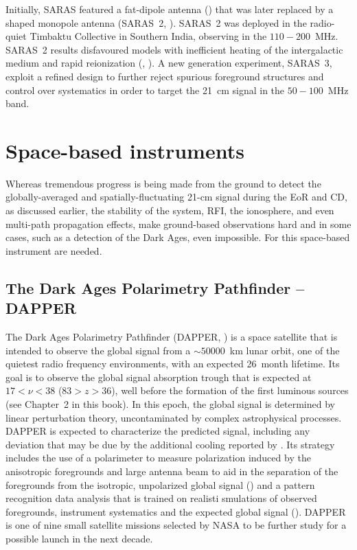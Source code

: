 Initially, SARAS featured a fat-dipole antenna (\cite{patra13}) that was later replaced by a shaped monopole antenna (SARAS~2, \cite{singh18a}). SARAS~2 was deployed in the radio-quiet Timbaktu Collective in Southern India, observing in the $110-200$~MHz. SARAS~2 results disfavoured models with inefficient heating of the intergalactic medium and rapid reionization (\cite{singh17}, \cite{singh18b}). 
A new generation experiment, SARAS~3, exploit a refined design to further reject spurious foreground structures and control over systematics in order to target the 21~cm signal in the $50-100$~MHz band.




\section{Space-based instruments}

Whereas tremendous progress is being made from the ground to detect the globally-averaged and spatially-fluctuating 21-cm signal during the EoR and CD, as discussed earlier, the stability of the system, RFI, the ionosphere, and even multi-path propagation effects, make ground-based observations hard and in some cases, such as a detection of the Dark Ages, even impossible. For this space-based instrument are needed. 






\subsection{The Dark Ages Polarimetry Pathfinder -- DAPPER}

The Dark Ages Polarimetry Pathfinder (DAPPER, \cite{burns19}) is a space satellite that is intended to observe the global signal from a $\sim 50000$~km lunar orbit, one of the quietest radio frequency environments, with an expected 26~month lifetime. Its goal is to observe the global signal absorption trough that is expected at $17 < \nu < 38$ ($83 > z > 36$), well before the formation of the first luminous sources (see Chapter~2 in this book). In this epoch, the global signal is determined by linear perturbation theory, uncontaminated by complex astrophysical processes. DAPPER is expected to characterize the predicted signal, including any deviation that may be due by the additional cooling reported by \cite{bowman18}. Its strategy includes the use of a polarimeter to measure polarization induced by the anisotropic foregrounds and large antenna beam to aid in the separation of the foregrounds from the isotropic, unpolarized global signal (\cite{nhan17}) and a pattern recognition data analysis that is trained on realisti smulations of observed foregrounds, instrument systematics and the expected global signal (\cite{tauscher18}).
%
DAPPER is one of nine small satellite missions selected by NASA to be further study for a possible launch in the next decade.



